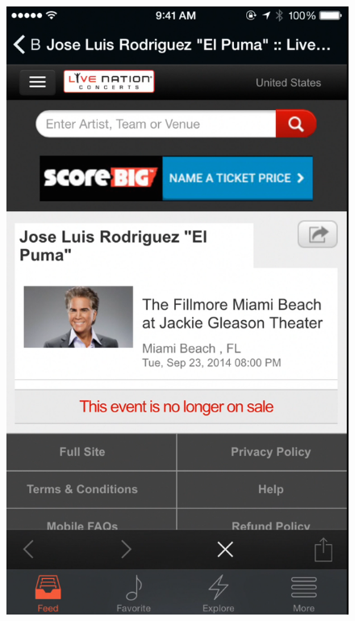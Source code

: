         \begin{figure}
        	\centering
        	\begin{minipage}{.5\textwidth}
        		\centering
        		\includegraphics[width=.7\linewidth]{./pics/app5.png}
        	\end{minipage}%
        	\begin{minipage}{.5\textwidth}
        		\centering

\end{minipage}
\end{figure}
